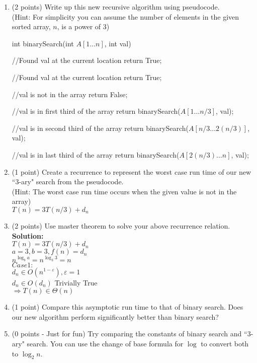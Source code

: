 \documentclass[12pt]{elsart}
\begin{document}
\begin{enumerate}
   \item   (2 points) Write up this new recursive algorithm using pseudocode.\\
(Hint: For simplicity you can assume the number of elements in the given sorted array, $n$, is a power of $3$)\\
\begin{algorithm}
\caption{int binarySearch(int $A[1\ldots n]$, int val)}
 \begin{algorithmic}
    \State //Found val at the current location
    \State return True;

    \State //Found val at the current location
    \State return True;

    \State //val is not in the array
    \State return False;


    \State //val is in first third of the array
    \State return binarySearch($A[1\ldots n/3]$, val);

    \State //val is in second third of the array
    \State return binarySearch($A[n/3 \ldots 2(n/3)]$, val);
 
    \State //val is in last third of the array
    \State return binarySearch($A[2(n/3) \ldots n]$, val);
 \EndIf
\end{algorithmic}
\end{algorithm}
   \item   (1 point) Create a recurrence to represent the worst case run time of our new ``$3$-ary" search from the pseudocode.\\
(Hint: The worst case run time occurs when the given value is not in the array)\\
	$\boxed{T(n)=3T(n/3)+d_n}$\\
   \item   (2 points) Use master theorem to solve your above recurrence relation.\\
	{\bf Solution:}\\
	$T(n)=3T(n/3)+d_n$\\
	$a=3, b=3, f(n)=d_n$\\
	$n^{\log_b a}=n^{\log_3 3} = n$\\
	$Case 1:$\\
	$d_n \in O(n^{1-\varepsilon}), \varepsilon = 1$\\
	$d_n \in O(d_n)$ Trivially True\\
	$\Rightarrow \boxed{T(n) \in \Theta(n)}$\\
   \item   (1 point) Compare this asymptotic run time to that of binary search.  Does our new algorithm perform significantly better than binary search?
   \item  (0 points - Just for fun) Try comparing the constants of binary search and ``$3$-ary" search.  You can use the change of base formula for $\log$ to convert both to $\log_2n$.
\end{enumerate}
\end{document}
